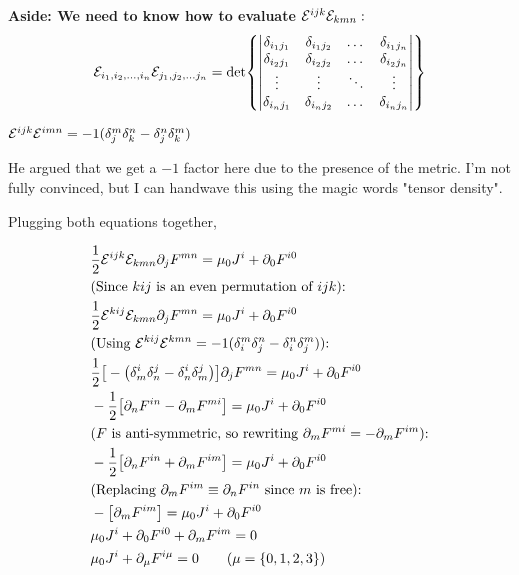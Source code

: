 \textbf{Aside: We need to know how to evaluate $\mathcal{E}^{ijk} \mathcal{E}_{kmn}:$}
\begin{align*}
    \mathcal{E}_{i_1, i_2, \dots, i_n} \mathcal{E}_{j_1, j_2, \dots j_n} =  
    \det{
    \begin{vmatrix}
        \delta_{i_1 j_1} & \delta_{i_1 j_2} &\dots &\delta_{i_1 j_n} \\
        \delta_{i_2 j_1} &\delta_{i_2 j_2} &\dots &\delta_{i_2 j_n} \\
        \vdots           &\vdots  & \ddots & \vdots \\
        \delta_{i_n j_1} & \delta_{i_n j_2} & \dots & \delta_{i_n j_n}
\end{vmatrix}}
\end{align*}

$\mathcal{E}^{ijk} \mathcal{E}^{imn} = -1 (\delta_j^m \delta_k^n - \delta_j^n \delta_k^m)$


He argued that we get a $-1$ factor here due to the presence of the
metric. I'm not fully convinced, but I can handwave this using the
magic words "tensor density".


Plugging both equations together,

\begin{align*}
    &\frac{1}{2} \levicevita^{ijk} \levicevita_{kmn} \partial_j F^{mn} =  \mu_0 J^i + \partial_0 F^{i0}  \\
    &\text{(Since $kij$ is an even permutation of $ijk$):} \\
    &\frac{1}{2} \levicevita^{kij} \levicevita_{kmn} \partial_j F^{mn} =  \mu_0 J^i + \partial_0 F^{i0}  \\
    &\text{(Using  $\levicevita^{kij} \levicevita^{kmn} = -1 (\delta_i^m \delta_j^n - \delta_i^n \delta_j^m)$):}\\
    &\frac{1}{2} \big[ 
   - \big(\delta^i_m \delta^j_n - \delta^i_n \delta^j_m\big) \big]
   \partial_j F^{mn} =  \mu_0 J^i + \partial_0 F^{i0} \\
   &- \frac{1}{2} \big[ \partial_n F^{in} - \partial_m F^{mi}  \big] = \mu_0 J^i + \partial_0 F^{i0}   \\
   &\text{($F$ is anti-symmetric, so rewriting $\partial_m F^{mi} = -\partial_m F^{im}$):} \\
   &-\frac{1}{2} \big[ \partial_n F^{in} + \partial_m F^{im} \big] = \mu_0 J^i + \partial_0 F^{i0}   \\
   &\text{(Replacing $\partial_m F^{im} \equiv \partial_n F^{in}$ since $m$ is free):} \\
   &-\big[ \partial_m F^{im} \big] = \mu_0 J^i + \partial_0 F^{i0}   \\
   &\mu_0 J^i + \partial_0 F^{i0}  + \partial_m F^{im}  = 0 \\
   &\mu_0 J^i + \partial_\mu F^{i\mu} = 0 \tag{$\mu = \{0, 1, 2, 3 \}$}
\end{align*}

